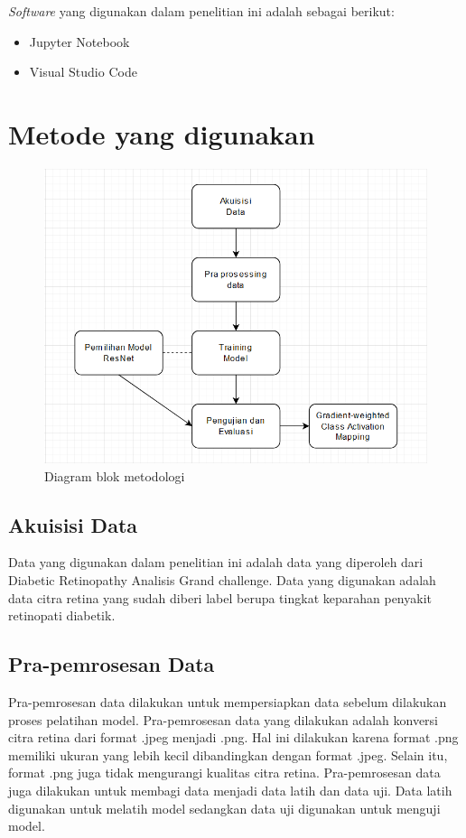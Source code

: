 \emph{Software} yang digunakan dalam penelitian ini adalah sebagai berikut:
\begin{itemize}
  \item Jupyter Notebook
  \item Visual Studio Code
\end{itemize}

\section{Metode yang digunakan}


\begin{figure} [H] \centering
  \includegraphics[scale=0.5]{gambar/diagramMethod.png}
  \caption{Diagram blok metodologi}
  \label{fig:diagramMethod}
\end{figure}

\subsection{Akuisisi Data}
Data yang digunakan dalam penelitian ini adalah data yang diperoleh dari Diabetic Retinopathy Analisis Grand challenge. Data yang digunakan adalah data citra retina yang sudah diberi label berupa tingkat keparahan penyakit retinopati diabetik.

\subsection{Pra-pemrosesan Data}
Pra-pemrosesan data dilakukan untuk mempersiapkan data sebelum dilakukan proses pelatihan model. Pra-pemrosesan data yang dilakukan adalah konversi citra retina dari format .jpeg menjadi .png. Hal ini dilakukan karena format .png memiliki ukuran yang lebih kecil dibandingkan dengan format .jpeg. Selain itu, format .png juga tidak mengurangi kualitas citra retina. Pra-pemrosesan data juga dilakukan untuk membagi data menjadi data latih dan data uji. Data latih digunakan untuk melatih model sedangkan data uji digunakan untuk menguji model.

